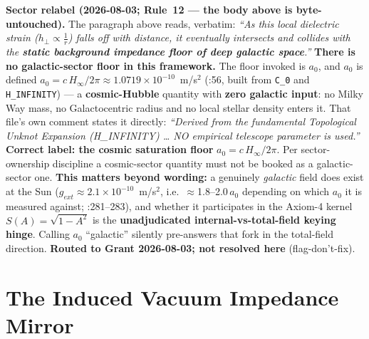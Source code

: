 \noindent\textbf{Sector relabel (2026-08-03; Rule~12 --- the body above is
byte-untouched).}  The paragraph above reads, verbatim: \emph{``As this local
dielectric strain ($h_{\perp} \propto \frac{1}{r}$) falls off with distance, it
eventually intersects and collides with the \textbf{static background impedance
floor of deep galactic space}.''}  \textbf{There is no galactic-sector floor in
this framework.}  The floor invoked is $a_0$, and $a_0$ is defined
$a_0 = c\,H_\infty/2\pi \approx 1.0719\times10^{-10}$~m/s$^2$
(:56, built from
\texttt{C\_0} and \texttt{H\_INFINITY}) --- a \textbf{cosmic-Hubble} quantity
with \textbf{zero galactic input}: no Milky Way mass, no Galactocentric radius
and no local stellar density enters it.  That file's own comment states it
directly: \emph{``Derived from the fundamental Topological Unknot Expansion
(H\_INFINITY) \ldots{} NO empirical telescope parameter is used.''}
\textbf{Correct label: the cosmic saturation floor} $a_0 = c\,H_\infty/2\pi$.
Per sector-ownership discipline a cosmic-sector quantity must not be booked as
a galactic-sector one.  \textbf{This matters beyond wording:} a genuinely
\emph{galactic} field does exist at the Sun
($g_{ext} \approx 2.1\times10^{-10}$~m/s$^2$, i.e.\ $\approx$1.8--2.0$\,a_0$
depending on which $a_0$ it is measured against;
:281--283), and
whether it participates in the Axiom-4 kernel $S(A) = \sqrt{1-A^2}$ is the
\textbf{unadjudicated internal-vs-total-field keying hinge}.  Calling $a_0$
``galactic'' silently pre-answers that fork in the total-field direction.
\textbf{Routed to Grant 2026-08-03; not resolved here} (flag-don't-fix).

\section{The Induced Vacuum Impedance Mirror}
\label{sec:induced_vacuum_impedance_mirror}

